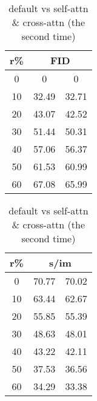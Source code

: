 \begin{table}[htp]
\caption{default vs self-attn \& cross-attn (the second time)}
    \begin{minipage}{0.48\textwidth}
        \centering
        \begin{tabular}{|c||c|c|}
            \hline
            \multicolumn{1}{|c||}{r\%} & \multicolumn{2}{c|}{FID}\\
            \hline
            0 & 0 & 0 \\
            10 & 32.49 & 32.71 \\
            20 & 43.07 & 42.52 \\
            30 & 51.44 & 50.31 \\
            40 & 57.06 & 56.37 \\
            50 & 61.53 & 60.99 \\
            60 & 67.08 & 65.99 \\
            \hline
        \end{tabular}
    \end{minipage}
    \hfill
    \begin{minipage}{0.48\textwidth}
        \centering
        \begin{tabular}{|c||c|c|}
            \hline
            \multicolumn{1}{|c||}{r\%} & \multicolumn{2}{c|}{s/im}\\
            \hline
            0 & 70.77 & 70.02 \\
            10 & 63.44 & 62.67 \\
            20 & 55.85 & 55.39 \\
            30 & 48.63 & 48.01 \\
            40 & 43.22 & 42.11 \\
            50 & 37.53 & 36.56 \\
            60 & 34.29 & 33.38 \\
            \hline
        \end{tabular}
    \end{minipage}
\end{table}